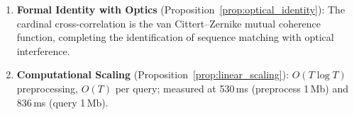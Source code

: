 \begin{chapterbox}[title=Chapter 27 --- Key Results Established]
\begin{enumerate}[label=\textbf{\arabic*.}]
  \item \textbf{Formal Identity with Optics}
        (Proposition~\ref{prop:optical_identity}): The cardinal cross-correlation
        is the van Cittert--Zernike mutual coherence function, completing the
        identification of sequence matching with optical interference.

  \item \textbf{Computational Scaling} (Proposition~\ref{prop:linear_scaling}):
        $O(T \log T)$ preprocessing, $O(T)$ per query; measured at 530\,ms
        (preprocess 1\,Mb) and 836\,ms (query 1\,Mb).
\end{enumerate}
\end{chapterbox}
